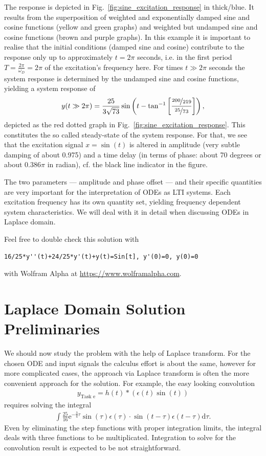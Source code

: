 \documentclass[a4paper,11pt,oneside]{scrartcl}
\begin{document}
The response is depicted in Fig.~\ref{fig:sine_excitation_response} in
thick/blue.
It results from the superposition of weighted and exponentially damped sine and
cosine functions (yellow and green graphs) and weighted but undamped sine and
cosine functions (brown and purple graphs).
In this example it is important to realise that the initial conditions (damped
sine and cosine) contribute
to the response only up to approximately $t=2\pi$
seconds, i.e. in the first period $T=\frac{2\pi}{\omega_D}=2\pi$ of the
excitation's frequency here.
%
For times $t\gg2\pi$ seconds the system response is determined by the
undamped sine and cosine functions, yielding a system response of
\begin{align}
y(t\gg 2\pi) = \frac{25}{3 \sqrt{73}}
\sin\left(t-\tan^{-1}
\left[\frac{\nicefrac{200}{219}}{\nicefrac{25}{73}}\right]\right),
\end{align}
depicted as the red dotted graph in Fig.~\ref{fig:sine_excitation_response}.
This constitutes the so called steady-state of the system response.
For that, we see that the excitation signal $x=\sin(t)$ is altered in amplitude
(very subtle damping of about 0.975) and
a time delay (in terms of phase: about 70 degrees or about $0.386 \pi$ in
radian), cf. the black line indicator in the figure.

The two parameters --- amplitude and phase offset ---
and their specific quantities are very important for the
interpretation of ODEs as LTI systems. Each excitation frequency has its own
quantity set, yielding frequency dependent system characteristics.
We will deal with it in detail when discussing ODEs in Laplace domain.


Feel free to double check this solution with
\begin{verbatim}
16/25*y''(t)+24/25*y'(t)+y(t)=Sin[t], y'(0)=0, y(0)=0
\end{verbatim}
with Wolfram Alpha at \url{https://www.wolframalpha.com}.





\section{Laplace Domain Solution Preliminaries}
We should now study the problem with the help of Laplace transform.
For the chosen ODE and input signals the calculus effort is about the same,
however for more complicated cases, the approach via Laplace transform
is often the more convenient approach for the solution.
%
For example, the easy looking convolution
\begin{align}
y_\text{Task e} = h(t) * (\epsilon(t) \sin(t))
\end{align}
requires solving the integral
\begin{align}
\int
\frac{25}{16} \mathrm{e}^{-\frac{3}{4} \tau} \sin(\tau) \epsilon(\tau) \cdot
\sin(t-\tau) \epsilon(t-\tau) \mathrm{d}\tau.
\end{align}
Even by eliminating the step functions with proper
integration limits, the integral deals with three functions to be multiplicated.
Integration to solve for the convolution result is expected to be not
straightforward.
\end{document}

